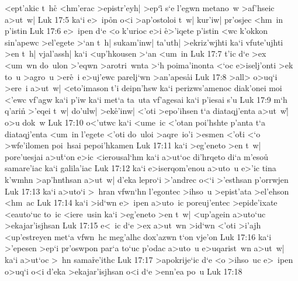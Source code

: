 <ept'akic
t~hc\r{}
<hm'erac
>epistr'eyh|
>ep`i\r{}
s`e
l'egwn
metano~w
>af'hseic
a>ut~w|\bibvsend
\vs Luk 17:5
ka`i
e>~ip\r{o}n
o<i
>ap'ostoloi
t~w|
kur'iw|
pr'osjec
<hm~in
p'istin\bibvsend
\vs Luk 17:6
e>~ipen
d`e
<o
k'urioc
e>i
\r{e}>'iqete
p'istin
<wc
k'okkon
sin'apewc
>el'egete
>`an
t~h|
sukam'inw|
ta'uth|
>ekriz'wjhti
ka`i
vfute'ujhti
>en
t~h|
vjal'assh|
ka`i
<up'hkousen
>`an
<um~in\bibvsend
\vs Luk 17:7
t'ic
d`e
>ex
<um~wn
do~ulon
>'eqwn
>arotri~wnta
>`h
poima'inonta
<`oc
e>iselj'onti
>ek
to~u
>agro~u
>er\r{e}~i
e>uj'ewc
parelj`wn
>an'apes\r{a}i\bibvsend
{}
\vs Luk 17:8
>all>
o>uq`i
>ere~i
a>ut~w|
<eto'imason
t'i
deipn'hsw
ka`i
perizws'amenoc
diak'onei
moi
<'ewc
vf'agw
ka`i
p'iw
ka`i
met`a
ta~uta
vf'agesai
ka`i
p'iesai
s'u\bibvsend
\vs Luk 17:9
m`h
q'arin\r{}
>'eqei
t~w|
do'ulw|
>ek\r{e}'inw|
<'oti
>epo'ihsen
t`a
diataqj'enta
a>ut~w|\r{}
o>u
dok~w\bibvsend
\vs Luk 17:10
o<'utwc
ka`i
<ume~ic
<'otan
poi'hshte
p'anta
t`a
diataqj'enta
<um~in
l'egete
<'oti
do~uloi
>aqre~io'i
>esmen
<'o\r{t}i
<`o
>wfe'ilomen
poi~hsai
pepoi'hkamen\bibvsend
\vs Luk 17:11
ka`i
>eg'eneto
>en
t~w|
pore'uesjai
a>u\r{t}`on
e>ic
<ierousal`hm
ka`i
a>ut`oc
di'hrqeto
di`a
m'eso\r{u}
samare'iac
ka`i
galila'iac\bibvsend
\vs Luk 17:12
ka`i
e>iserqom'enou
a>uto~u
e>'ic
tina
k'wmhn
>ap'hnthsan
a>ut~w|
d'eka
lepro`i
>'andrec
o<`i
>'esthsan
p'orrwjen\bibvsend
\vs Luk 17:13
ka`i
a>uto`i
>~hran
vfwn`hn
l'egontec
>ihso~u
>epist'ata
>el'ehson
<hm~ac\bibvsend
\vs Luk 17:14
ka`i
>id`wn
e>~ipen
a>uto~ic
poreuj'entec
>epide'ixate
<eauto`uc
to~ic
<iere~usin
ka`i
>eg'eneto
>en
t~w|
<up'agein
a>uto`uc
>ekajar'isjhsan\bibvsend
\vs Luk 17:15
e<~ic
d`e
>ex
a>ut~wn
>id`wn
<'oti
>i'ajh
<up'estreyen
met`a
vfwn~hc
meg'alhc
dox'azwn
t`on
vje'on\bibvsend
\vs Luk 17:16
ka`i
>'epesen
>ep`i
pr'oswpon
par`a
to`uc
p'odac
a>uto~u
e>uqarist~wn
a>ut~w|
ka`i
a>ut`oc
>~hn
sama\r{r}e'ithc\bibvsend
{}
\vs Luk 17:17
>apokrije`ic
d`e
<o
>ihso~uc
e>~ipen
o>uq`i
o<i
d'eka
>ekajar'isjhsan
o<i
d`e
>enn'ea
po~u\bibvsend
\vs Luk 17:18
